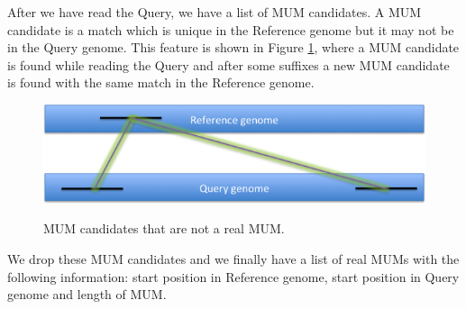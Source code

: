 \documentclass[runningheads,a4paper]{llncs}
\begin{document}
After we have read the Query, we have a list of MUM candidates. A MUM candidate is a match which is unique in the Reference genome but it may not be in the Query genome. This feature is shown in Figure \ref{fig:mumcand}, where a MUM candidate is found while reading the Query and after some suffixes a new MUM candidate is found with the same match in the Reference genome.
\begin{figure}
\centering
\includegraphics[scale=0.5]{Whole-MUM.png}
\label{fig:mumcand}
\caption{MUM candidates that are not a real MUM.}
\end{figure}
We drop these MUM candidates and we finally have a list of real MUMs with the following information: start position in Reference genome, start position in Query genome and length of MUM.
\end{document}
